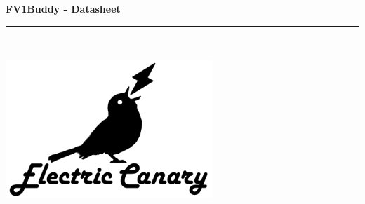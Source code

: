 \documentclass[a4paper, 10pt]{article}
\begin{document}
\thispagestyle{plain}
\begin{center}
\begin{Huge}
\vspace*{0.5cm}
\textbf{FV1Buddy - Datasheet}
\rule {0.95\textwidth}{2pt}\\
\end{Huge}
\vspace{1cm}
\includegraphics[scale=1]{logocentre}\\
\end{center}
\vspace{1cm}
\end{document}
